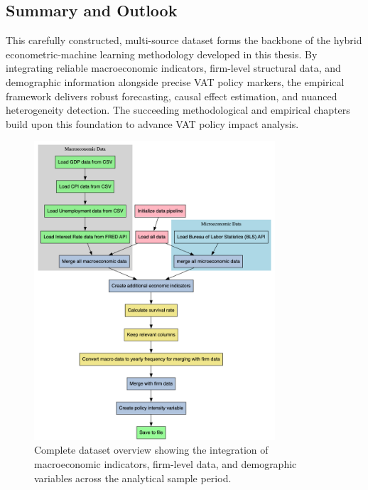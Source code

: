 \subsection{Summary and Outlook}

This carefully constructed, multi-source dataset forms the backbone of the hybrid econometric-machine learning methodology developed in this thesis. By integrating reliable macroeconomic indicators, firm-level structural data, and demographic information alongside precise VAT policy markers, the empirical framework delivers robust forecasting, causal effect estimation, and nuanced heterogeneity detection. The succeeding methodological and empirical chapters build upon this foundation to advance VAT policy impact analysis.

\begin{figure}[htbp]
\centering
\includegraphics[width=0.8\textwidth]{images/wholedata.png}
\caption{Complete dataset overview showing the integration of macroeconomic indicators, firm-level data, and demographic variables across the analytical sample period.}
\label{fig:wholedata}
\end{figure}


